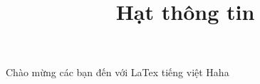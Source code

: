 \documentclass[12pt]{article}
\title{Hạt thông tin}
\begin{document}
Chào mừng các bạn đến với LaTex tiếng việt
Haha
\end{document}
